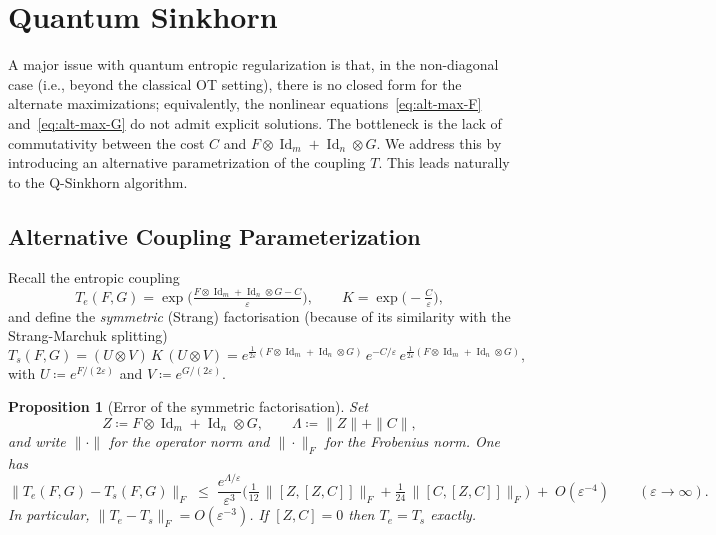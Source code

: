 \documentclass[10pt]{article}
\newcommand{\Id}{\operatorname{Id}}
\renewcommand{\epsilon}{\varepsilon}
\theoremstyle{plain}
\newtheorem{prop}{Proposition}
\theoremstyle{definition}
\theoremstyle{remark}
\begin{document}
\section{Quantum Sinkhorn}\label{sec:qsinkhorn}

A major issue with quantum entropic regularization is that, in the non-diagonal case (i.e., beyond the classical OT setting), there is no closed form for the alternate maximizations; equivalently, the nonlinear equations~\eqref{eq:alt-max-F} and~\eqref{eq:alt-max-G} do not admit explicit solutions. The bottleneck is the lack of commutativity between the cost $C$ and $F\otimes \Id_m+\Id_n\otimes G$. We address this by introducing an alternative parametrization of the coupling $T$. This leads naturally to the Q\mbox{-}Sinkhorn algorithm.

\subsection{Alternative Coupling Parameterization}\label{sec:approx-factor}

Recall the entropic coupling
\[
T_e(F,G)=\exp\Big(\tfrac{F\otimes \Id_m+\Id_n\otimes G - C}{\epsilon}\Big),
\qquad
K=\exp\Big(-\tfrac{C}{\epsilon}\Big),
\]
and define the \emph{symmetric} (Strang) factorisation (because of its similarity with the Strang-Marchuk splitting)
\begin{equation}\label{eq:symm-factorization}
T_s(F,G)=(U\otimes V)\,K\,(U\otimes V)
=e^{\tfrac{1}{2\epsilon}(F\otimes \Id_m+\Id_n\otimes G)}\,e^{-C/\epsilon}\,e^{\tfrac{1}{2\epsilon}(F\otimes \Id_m+\Id_n\otimes G)},
\end{equation}
with $U\coloneqq e^{F/(2\epsilon)}$ and $V\coloneqq e^{G/(2\epsilon)}$. 

\begin{prop}[Error of the symmetric factorisation]\label{prop:Ts-bound-only}
Set
\[
Z\coloneqq F\otimes \Id_m+\Id_n\otimes G,
\qquad
\Lambda \coloneqq  \|Z\|+\|C\|,
\]
and write $\|\cdot\|$ for the operator norm and $\|\cdot\|_F$ for the Frobenius norm.
%
One has
\begin{equation}\label{eq:Ts-bound-only}
\|T_e(F,G)-T_s(F,G)\|_F
\;\le\;
\frac{e^{\Lambda/\epsilon}}{\epsilon^{3}}
\Big(\tfrac{1}{12}\,\|[Z,[Z,C]]\|_F
+\tfrac{1}{24}\,\|[C,[Z,C]]\|_F\Big)
\;+\;O(\epsilon^{-4}) \qquad (\epsilon\to\infty).
\end{equation}
In particular, $\|T_e-T_s\|_F=O(\epsilon^{-3})$. If $[Z,C]=0$ then $T_e=T_s$ exactly.
\end{prop}
\end{document}
